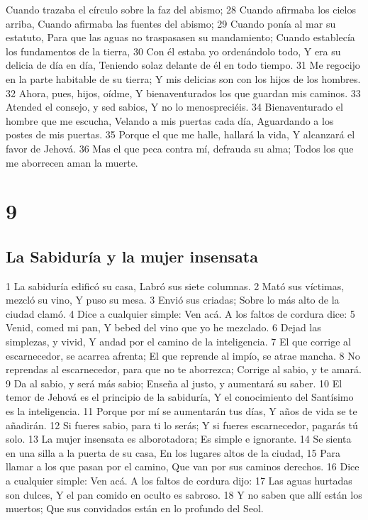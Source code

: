 Cuando trazaba el círculo sobre la faz del abismo;
28 Cuando afirmaba los cielos arriba,
Cuando afirmaba las fuentes del abismo;
29 Cuando ponía al mar su estatuto,
Para que las aguas no traspasasen su mandamiento;
Cuando establecía los fundamentos de la tierra,
30 Con él estaba yo ordenándolo todo,
Y era su delicia de día en día,
Teniendo solaz delante de él en todo tiempo.
31 Me regocijo en la parte habitable de su tierra;
Y mis delicias son con los hijos de los hombres.
32 Ahora, pues, hijos, oídme,
Y bienaventurados los que guardan mis caminos.
33 Atended el consejo, y sed sabios,
Y no lo menospreciéis.
34 Bienaventurado el hombre que me escucha,
Velando a mis puertas cada día,
Aguardando a los postes de mis puertas. 
35 Porque el que me halle, hallará la vida,
Y alcanzará el favor de Jehová.
36 Mas el que peca contra mí, defrauda su alma;
Todos los que me aborrecen aman la muerte. 

\chapter{9}

\section*{La Sabiduría y la mujer insensata}

1 La sabiduría edificó su casa,
Labró sus siete columnas.
2 Mató sus víctimas, mezcló su vino,
Y puso su mesa.
3 Envió sus criadas;
Sobre lo más alto de la ciudad clamó.
4 Dice a cualquier simple: Ven acá.
A los faltos de cordura dice:
5 Venid, comed mi pan,
Y bebed del vino que yo he mezclado.
6 Dejad las simplezas, y vivid,
Y andad por el camino de la inteligencia.
7 El que corrige al escarnecedor, se acarrea afrenta;
El que reprende al impío, se atrae mancha.
8 No reprendas al escarnecedor, para que no te aborrezca;
Corrige al sabio, y te amará.
9 Da al sabio, y será más sabio;
Enseña al justo, y aumentará su saber.
10 El temor de Jehová es el principio de la sabiduría, 
Y el conocimiento del Santísimo es la inteligencia.
11 Porque por mí se aumentarán tus días,
Y años de vida se te añadirán.
12 Si fueres sabio, para ti lo serás;
Y si fueres escarnecedor, pagarás tú solo.
13 La mujer insensata es alborotadora;
Es simple e ignorante.
14 Se sienta en una silla a la puerta de su casa,
En los lugares altos de la ciudad,
15 Para llamar a los que pasan por el camino,
Que van por sus caminos derechos.
16 Dice a cualquier simple: Ven acá.
A los faltos de cordura dijo:
17 Las aguas hurtadas son dulces,
Y el pan comido en oculto es sabroso.
18 Y no saben que allí están los muertos;
Que sus convidados están en lo profundo del Seol.

